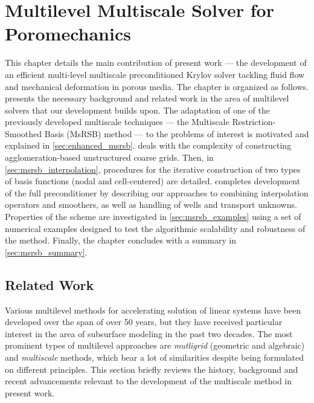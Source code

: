 \chapter{Multilevel Multiscale Solver for Poromechanics}
\label{ch:multiscale_poromechanics}

This chapter details the main contribution of present work --- the development of an efficient multi-level multiscale preconditioned Krylov solver tackling fluid flow and mechanical deformation in porous media. The chapter is organized as follows.  presents the necessary background and related work in the area of multilevel solvers that our development builds upon. The adaptation of one of the previously developed multiscale techniques --- the Multiscale Restriction-Smoothed Basis (MsRSB) method --- to the problems of interest is motivated and explained in \cref{sec:enhanced_msrsb}.    deals with the complexity of constructing agglomeration-based unstructured coarse grids.   Then, in \cref{sec:msrsb_interpolation}, procedures for the iterative construction of two types of basis functions (nodal and cell-centered) are detailed.    completes development of the full preconditioner by describing our approaches to combining interpolation operators and smoothers, as well as handling of wells and transport unknowns.   Properties of the scheme are investigated in \cref{sec:msrsb_examples} using a set of numerical examples designed to test the algorithmic scalability and robustness of the method.   Finally, the chapter concludes with a summary in \cref{sec:msrsb_summary}.

\section{Related Work}
\label{sec:related_work}

Various multilevel methods for accelerating solution of linear systems have been developed over the span of over 50 years, but they have received particular interest in the area of subsurface modeling in the past two decades.    The most prominent types of multilevel approaches are \textit{mutligrid} (geometric and algebraic) and \textit{multiscale} methods, which bear a lot of similarities despite being formulated on different principles.    This section briefly reviews the history, background and recent advancements relevant to the development of the multiscale method in present work.

